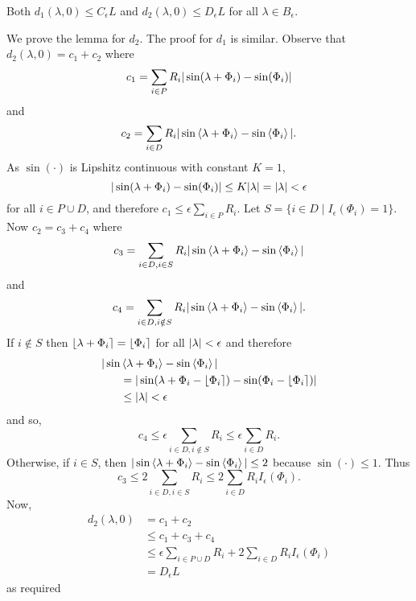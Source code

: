 \documentclass[journal]{IEEEtran}
\begin{document}
\begin{lemma}\label{lem:epslmlemma}
Both $d_1(\lambda, 0) \leq C_\epsilon L $ and $d_2(\lambda, 0) \leq D_\epsilon L$ for all $\lambda \in B_\epsilon$.
\end{lemma}
\begin{IEEEproof}
We prove the lemma for $d_2$.  The proof for $d_1$ is similar.  Observe that $d_2(\lambda, 0) = c_1 + c_2$ where 
 \[
 c_1 = \sum_{i \in P} R_i{\vert \sin(\lambda + \Phi_i) - \sin(\Phi_i)  \vert}
 \]
 and 
 \[
 c_2 = \sum_{i \in D} R_i {\vert \sin\left\langle \lambda + \Phi_i \right\rangle - \sin\left\langle \Phi_i \right\rangle \vert}.
 \]
 As $\sin(\cdot)$ is Lipshitz continuous with constant $K=1$,
 \[
 {\vert \sin(\lambda + \Phi_i) - \sin(\Phi_i) \vert} \leq K{\vert \lambda \vert} = {\vert \lambda \vert} < \epsilon
 \]
 for all $i \in P \cup D$, and therefore $c_1 \leq \epsilon \sum_{i \in P} R_i$.  Let $S = \{ i \in D \mid I_\epsilon(\Phi_i) = 1\}$. Now $c_2 = c_3 + c_4$ where 
 \[
 c_3 = \sum_{i \in D, i \in S} R_i {\vert \sin\left\langle \lambda + \Phi_i \right\rangle - \sin\left\langle \Phi_i \right\rangle \vert}
 \]
 and
 \[
 c_4 =  \sum_{i \in D, i \notin S} R_i {\vert \sin\left\langle \lambda + \Phi_i \right\rangle - \sin\left\langle \Phi_i \right\rangle \vert}.
 \]
 If $i \notin S$ then ${\left\lfloor \lambda + \Phi_i \right\rceil} = {\left\lfloor \Phi_i \right\rceil}$ for all ${\vert \lambda \vert} < \epsilon$ and therefore
 \begin{align*}
 \vert\sin&\left\langle \lambda + \Phi_i \right\rangle - \sin\left\langle \Phi_i \right\rangle\vert \\
 &= {\vert \sin(\lambda + \Phi_i - {\left\lfloor \Phi_i \right\rceil}) - \sin(\Phi_i - {\left\lfloor \Phi_i \right\rceil}) \vert} \\
 &\leq {\vert \lambda \vert} < \epsilon
 \end{align*}
and so, 
\[
c_4 \leq \epsilon \sum_{i \in D, i \notin S} R_i \leq \epsilon \sum_{i \in D} R_i.
\]
Otherwise, if $i \in S$, then ${\vert \sin\left\langle \lambda + \Phi_i \right\rangle - \sin\left\langle \Phi_i \right\rangle \vert} \leq 2$ because $\sin(\cdot) \leq 1$.  Thus 
\[
c_3 \leq 2 \sum_{i \in D, i \in S} R_i \leq 2 \sum_{i \in D} R_i I_\epsilon(\Phi_i).
\]
Now,
\begin{align*}
d_2(\lambda, 0) &= c_1 + c_2 \\
&\leq c_1 + c_3 + c_4 \\
&\leq \epsilon \sum_{i \in P \cup D} R_i + 2 \sum_{i \in D} R_i I_\epsilon(\Phi_i) \\
&= D_\epsilon L
\end{align*}
as required
\end{IEEEproof}
\end{document}
